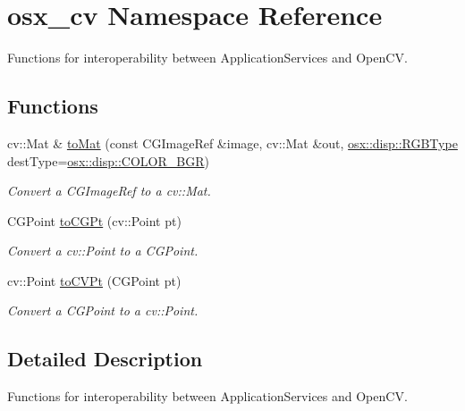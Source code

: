 \hypertarget{namespaceosx__cv}{\section{osx\-\_\-cv Namespace Reference}
\label{namespaceosx__cv}
}


Functions for interoperability between Application\-Services and Open\-C\-V.  


\subsection*{Functions}
\begin{DoxyCompactItemize}
\item 
cv\-::\-Mat \& \hyperlink{namespaceosx__cv_a06ac26ae0cdd938ae2885095282aef15}{to\-Mat} (const C\-G\-Image\-Ref \&image, cv\-::\-Mat \&out, \hyperlink{namespaceosx_1_1disp_a63adf9b0b0b0365ec428dd44fc30c659}{osx\-::disp\-::\-R\-G\-B\-Type} dest\-Type=\hyperlink{namespaceosx_1_1disp_a63adf9b0b0b0365ec428dd44fc30c659ab96ecb2ad3c69bf9019d7ed4253603b1}{osx\-::disp\-::\-C\-O\-L\-O\-R\-\_\-\-B\-G\-R})
\begin{DoxyCompactList}\small\item\em Convert a {\ttfamily C\-G\-Image\-Ref} to a {\ttfamily cv\-::\-Mat}. \end{DoxyCompactList}\item 
C\-G\-Point \hyperlink{namespaceosx__cv_a501b2a8c59949eb3d398e8a9b58372b4}{to\-C\-G\-Pt} (cv\-::\-Point pt)
\begin{DoxyCompactList}\small\item\em Convert a {\ttfamily cv\-::\-Point} to a {\ttfamily C\-G\-Point}. \end{DoxyCompactList}\item 
cv\-::\-Point \hyperlink{namespaceosx__cv_a9a9f0fa8d7a16879c88a19914a3c2484}{to\-C\-V\-Pt} (C\-G\-Point pt)
\begin{DoxyCompactList}\small\item\em Convert a {\ttfamily C\-G\-Point} to a {\ttfamily cv\-::\-Point}. \end{DoxyCompactList}\end{DoxyCompactItemize}


\subsection{Detailed Description}
Functions for interoperability between Application\-Services and Open\-C\-V. 

